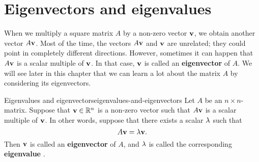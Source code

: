 \section{Eigenvectors and eigenvalues}

When we multiply a square matrix $A$ by a non-zero vector $\mbox{\bf v}$,
we obtain another vector $A\mbox{\bf v}$. Most of the time, the vectors
$A\mbox{\bf v}$ and $\mbox{\bf v}$ are unrelated; they could point in
completely different directions. However, sometimes it can happen that
$A\mbox{\bf v}$ is a scalar multiple of $\mbox{\bf v}$. In that case,
$\mbox{\bf v}$ is called an \textbf{eigenvector} of $A$. We will see later
in this chapter that we can learn a lot about the matrix $A$ by
considering its eigenvectors.

\begin{definition}{Eigenvalues and eigenvectors}{eigenvalues-and-eigenvectors}
  Let $A$ be an $n\times n$-matrix. Suppose that $\mbox{\bf v}\in\mathbb{R}^n$ is
  a non-zero vector such that $A\mbox{\bf v}$ is a scalar multiple of
  $\mbox{\bf v}$. In other words, suppose that there exists a scalar
  $\lambda$ such that
  \begin{equation*}
    A\mbox{\bf v}=\lambda\mbox{\bf v}.
  \end{equation*}
  Then $\mbox{\bf v}$ is called an \textbf{eigenvector}%
   of $A$, and $\lambda$ is called the
  corresponding \textbf{eigenvalue}%
  .
\end{definition}

